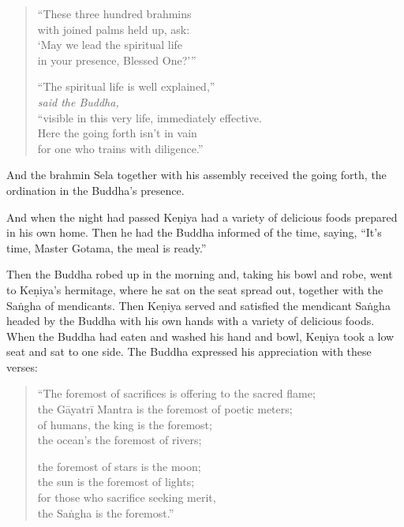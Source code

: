 \documentclass[12pt,openany]{book}%
\newcommand*{\scspeaker}[1]{\hspace{2em}\textit{#1}}
\begin{document}
\begin{verse}
“These three hundred brahmins \\
with joined palms held up, ask: \\
‘May we lead the spiritual life \\
in your presence, Blessed One?’” 

“The spiritual life is well explained,” \\
\scspeaker{said the Buddha, }\\
“visible in this very life, immediately effective. \\
Here the going forth isn’t in vain \\
for one who trains with diligence.” 

%
\end{verse}

And the brahmin Sela together with his assembly received the going forth, the ordination in the Buddha’s presence. 

And when the night had passed \textsanskrit{Keṇiya} had a variety of delicious foods prepared in his own home. Then he had the Buddha informed of the time, saying, “It’s time, Master Gotama, the meal is ready.” 

Then the Buddha robed up in the morning and, taking his bowl and robe, went to \textsanskrit{Keṇiya}’s hermitage, where he sat on the seat spread out, together with the \textsanskrit{Saṅgha} of mendicants. Then \textsanskrit{Keṇiya} served and satisfied the mendicant \textsanskrit{Saṅgha} headed by the Buddha with his own hands with a variety of delicious foods. When the Buddha had eaten and washed his hand and bowl, \textsanskrit{Keṇiya} took a low seat and sat to one side. The Buddha expressed his appreciation with these verses: 

\begin{verse}%
“The foremost of sacrifices is offering to the sacred flame; \\
the \textsanskrit{Gāyatrī} Mantra is the foremost of poetic meters; \\
of humans, the king is the foremost; \\
the ocean’s the foremost of rivers; 

the foremost of stars is the moon; \\
the sun is the foremost of lights; \\
for those who sacrifice seeking merit, \\
the \textsanskrit{Saṅgha} is the foremost.” 

%
\end{verse}
\end{document}

